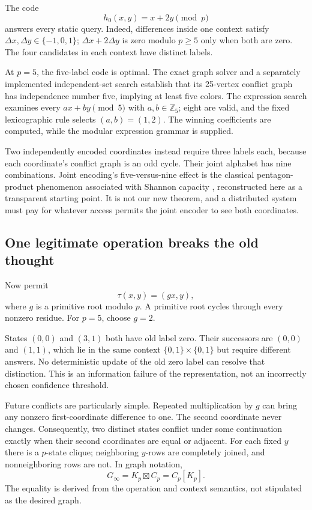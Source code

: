 \documentclass[11pt,letterpaper]{article}
\theoremstyle{remark}\newtheorem{remark}{Remark}[section]
\begin{document}
The code
\begin{equation}
 h_0(x,y)=x+2y\pmod p\label{eq:old}
\end{equation}
answers every static query. Indeed, differences inside one context satisfy $\Delta x,\Delta y\in\{-1,0,1\}$; $\Delta x+2\Delta y$ is zero modulo $p\ge5$ only when both are zero. The four candidates in each context have distinct labels.

At $p=5$, the five-label code is optimal. The exact graph solver and a separately implemented independent-set search establish that its 25-vertex conflict graph has independence number five, implying at least five colors. The expression search examines every $ax+by\pmod5$ with $a,b\in\mathbb Z_5$; eight are valid, and the fixed lexicographic rule selects $(a,b)=(1,2)$. The winning coefficients are computed, while the modular expression grammar is supplied.

Two independently encoded coordinates instead require three labels each, because each coordinate's conflict graph is an odd cycle. Their joint alphabet has nine combinations. Joint encoding's five-versus-nine effect is the classical pentagon-product phenomenon associated with Shannon capacity \citep{shannon,lovasz}, reconstructed here as a transparent starting point. It is not our new theorem, and a distributed system must pay for whatever access permits the joint encoder to see both coordinates.

\subsection{One legitimate operation breaks the old thought}
Now permit
\begin{equation}
 \tau(x,y)=(gx,y),\label{eq:tau}
\end{equation}
where $g$ is a primitive root modulo $p$. A primitive root cycles through every nonzero residue. For $p=5$, choose $g=2$.

States $(0,0)$ and $(3,1)$ both have old label zero. Their successors are $(0,0)$ and $(1,1)$, which lie in the same context $\{0,1\}\times\{0,1\}$ but require different answers. No deterministic update of the old zero label can resolve that distinction. This is an information failure of the representation, not an incorrectly chosen confidence threshold.

Future conflicts are particularly simple. Repeated multiplication by $g$ can bring any nonzero first-coordinate difference to one. The second coordinate never changes. Consequently, two distinct states conflict under some continuation exactly when their second coordinates are equal or adjacent. For each fixed $y$ there is a $p$-state clique; neighboring $y$-rows are completely joined, and nonneighboring rows are not. In graph notation,
\begin{equation}
 G_\infty=K_p\boxtimes C_p=C_p[K_p].\label{eq:blowup}
\end{equation}
The equality is derived from the operation and context semantics, not stipulated as the desired graph.
\end{document}
